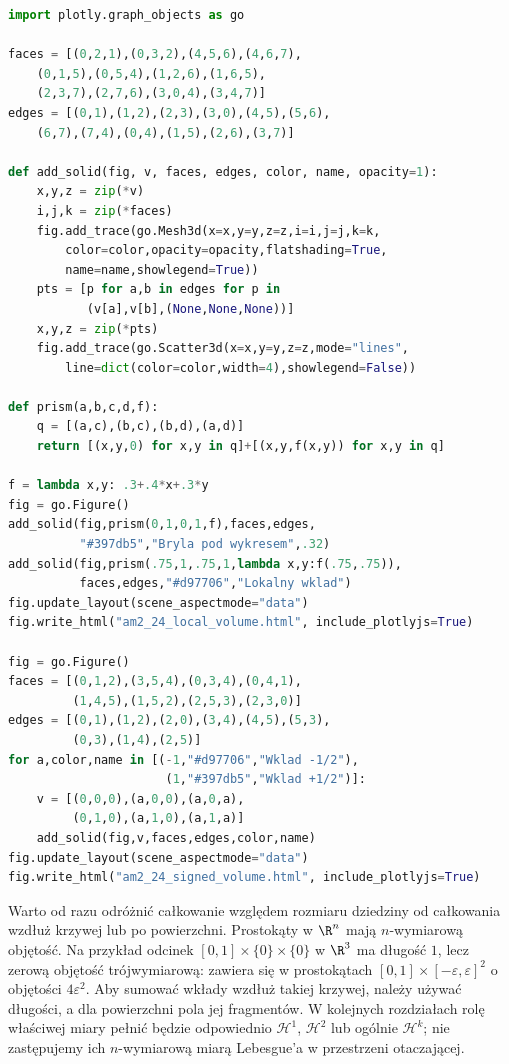 \begin{lstlisting}[language=Python]
import plotly.graph_objects as go

faces = [(0,2,1),(0,3,2),(4,5,6),(4,6,7),
    (0,1,5),(0,5,4),(1,2,6),(1,6,5),
    (2,3,7),(2,7,6),(3,0,4),(3,4,7)]
edges = [(0,1),(1,2),(2,3),(3,0),(4,5),(5,6),
    (6,7),(7,4),(0,4),(1,5),(2,6),(3,7)]

def add_solid(fig, v, faces, edges, color, name, opacity=1):
    x,y,z = zip(*v)
    i,j,k = zip(*faces)
    fig.add_trace(go.Mesh3d(x=x,y=y,z=z,i=i,j=j,k=k,
        color=color,opacity=opacity,flatshading=True,
        name=name,showlegend=True))
    pts = [p for a,b in edges for p in
           (v[a],v[b],(None,None,None))]
    x,y,z = zip(*pts)
    fig.add_trace(go.Scatter3d(x=x,y=y,z=z,mode="lines",
        line=dict(color=color,width=4),showlegend=False))

def prism(a,b,c,d,f):
    q = [(a,c),(b,c),(b,d),(a,d)]
    return [(x,y,0) for x,y in q]+[(x,y,f(x,y)) for x,y in q]

f = lambda x,y: .3+.4*x+.3*y
fig = go.Figure()
add_solid(fig,prism(0,1,0,1,f),faces,edges,
          "#397db5","Bryla pod wykresem",.32)
add_solid(fig,prism(.75,1,.75,1,lambda x,y:f(.75,.75)),
          faces,edges,"#d97706","Lokalny wklad")
fig.update_layout(scene_aspectmode="data")
fig.write_html("am2_24_local_volume.html", include_plotlyjs=True)

fig = go.Figure()
faces = [(0,1,2),(3,5,4),(0,3,4),(0,4,1),
         (1,4,5),(1,5,2),(2,5,3),(2,3,0)]
edges = [(0,1),(1,2),(2,0),(3,4),(4,5),(5,3),
         (0,3),(1,4),(2,5)]
for a,color,name in [(-1,"#d97706","Wklad -1/2"),
                      (1,"#397db5","Wklad +1/2")]:
    v = [(0,0,0),(a,0,0),(a,0,a),
         (0,1,0),(a,1,0),(a,1,a)]
    add_solid(fig,v,faces,edges,color,name)
fig.update_layout(scene_aspectmode="data")
fig.write_html("am2_24_signed_volume.html", include_plotlyjs=True)
\end{lstlisting}


Warto od razu odróżnić całkowanie
względem rozmiaru dziedziny od całkowania
wzdłuż krzywej lub po powierzchni.
Prostokąty w $\R^n$ mają $n$-wymiarową
objętość. Na przykład odcinek $[0,1]\times\{0\}\times\{0\}$
w $\R^3$ ma długość $1$, lecz zerową objętość
trójwymiarową: zawiera się w prostokątach
$[0,1]\times[-\varepsilon,\varepsilon]^2$
o objętości $4\varepsilon^2$. Aby sumować wkłady wzdłuż
takiej krzywej, należy używać długości,
a dla powierzchni pola jej fragmentów.
W kolejnych rozdziałach rolę właściwej
miary pełnić będzie odpowiednio
$\mathcal H^1$, $\mathcal H^2$ lub ogólnie
$\mathcal H^k$; nie zastępujemy ich
$n$-wymiarową miarą Lebesgue'a w przestrzeni
otaczającej.

